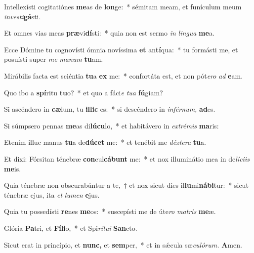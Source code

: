 \item Intellexísti cogitatiónes \textbf{me}as de \textbf{lon}ge:~* sémitam meam, et funículum meum \textit{investi}\textbf{gá}sti.
\item Et omnes vias meas \textbf{præ}vi\textbf{dí}sti:~* quia non est sermo \textit{in} \textit{lingua} \textbf{me}a.
\item Ecce Dómine tu cognovísti ómnia novíssima \textbf{et} an\textbf{tí}qua:~* tu formásti me, et posuísti super \textit{me} \textit{manum} \textbf{tu}am.
\item Mirábilis facta est sciéntia \textbf{tu}a \textbf{ex} me:~* confortáta est, et non pót\tinyhspace\textit{ero} \textit{ad} \textbf{e}am.
\item Quo ibo a \textbf{spí}ritu \textbf{tu}o?~* et quo a fáci\textit{e} \textit{tua} \textbf{fú}giam?
\item Si ascéndero in \textbf{cæ}lum, tu \textbf{il}\textbf{lic} es:~* si descéndero in \textit{inférnum,} \textbf{ad}es.
\item Si súmpsero pennas \textbf{me}as di\textbf{lú}\textbf{cu}lo,~* et habitávero in \textit{extrémis} \textbf{ma}ris:
\item Etenim illuc manus \textbf{tu}a de\textbf{dú}\textbf{cet} me:~* et tenébit me \textit{déxtera} \textbf{tu}a.
\item Et dixi: Fórsitan ténebræ \textbf{con}cul\textbf{cá}\textbf{bunt} me:~* et nox illuminátio mea in de\tinyhspace\textit{líciis} \textbf{me}is.
\item Quia ténebræ non obscurabúntur a te,~† et nox sicut dies il\textbf{lu}mi\textbf{ná}\textbf{bi}tur:~* sicut ténebræ ejus, ita \textit{et} \textit{lumen} \textbf{e}jus.
\item Quia tu possedísti \textbf{re}nes \textbf{me}os:~* suscepísti me de úte\textit{ro} \textit{matris} \textbf{me}æ.
\item Glória \textbf{Pa}tri, et \textbf{Fí}\textbf{li}o,~* et Spi\tinyhspace\textit{rítui} \textbf{San}cto.
\item Sicut erat in princípio, et \textbf{nunc,} et \textbf{sem}per,~* et in sǽcula sæ\tinyhspace\textit{culórum.} \textbf{A}men.

